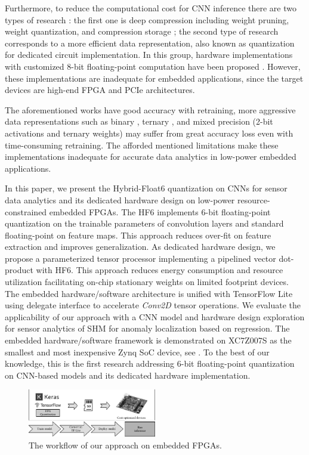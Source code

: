 Furthermore, to reduce the computational cost for CNN inference there are two types of research \cite{wu2021low}: the first one is deep compression including weight pruning, weight quantization, and compression storage \cite{han2015deep,han2015learning}; the second type of research corresponds to a more efficient data representation, also known as quantization for dedicated circuit implementation. In this group, hardware implementations with customized 8-bit floating-point computation have been proposed \cite{mei2017200mhz, wu2021low, lian2019high}. However, these implementations are inadequate for embedded applications, since the target devices are high-end FPGA and PCIe architectures.

The aforementioned works have good accuracy with retraining, more aggressive data representations such as binary \cite{courbariaux2015binaryconnect}, ternary \cite{lin2015neural}, and mixed precision (2-bit activations and ternary weights) \cite{colangelo2018exploration} may suffer from great accuracy loss even with time-consuming retraining. The afforded mentioned limitations make these implementations inadequate for accurate data analytics in low-power embedded applications.

In this paper, we present the Hybrid-Float6 quantization on CNNs for sensor data analytics and its dedicated hardware design on low-power resource-constrained embedded FPGAs. The HF6 implements 6-bit floating-point quantization on the trainable parameters of convolution layers and standard floating-point on feature maps. This approach reduces over-fit on feature extraction and improves generalization. As dedicated hardware design, we propose a parameterized tensor processor implementing a pipelined vector dot-product with HF6. This approach reduces energy consumption and resource utilization facilitating on-chip stationary weights on limited footprint devices. The embedded hardware/software architecture is unified with TensorFlow Lite using delegate interface to accelerate \emph{Conv2D} tensor operations. We evaluate the applicability of our approach with a CNN model and hardware design exploration for sensor analytics of SHM for anomaly localization based on regression. The embedded hardware/software framework is demonstrated on XC7Z007S as the smallest and most inexpensive Zynq SoC device, see . To the best of our knowledge, this is the first research addressing 6-bit floating-point quantization on CNN-based models and its dedicated hardware implementation.

\begin{figure}[t!]
	\centering
	\includegraphics[width=0.5\textwidth]{../figures/workflow.pdf}
	\caption{The workflow of our approach on embedded FPGAs.}
	\label{fig:workflow}
\end{figure}

